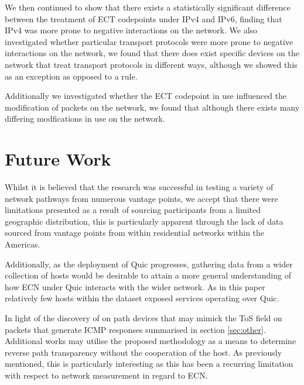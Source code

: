 \documentclass{l4proj}
\begin{document}
We then continued to show that there exists a statistically significant difference between the treatment of ECT codepoints under IPv4 and IPv6, finding that IPv4 was more prone to negative interactions on the network. We also investigated whether particular transport protocols were more prone to negative interactions on the network, we found that there does exist specific devices on the network that treat transport protocols in different ways, although we showed this as an exception as opposed to a rule.

Additionally we investigated whether the ECT codepoint in use influenced the modification of packets on the network, we found that although there exists many differing modfications in use on the network.


\section{Future Work}

Whilst it is believed that the research was successful in testing a variety of network pathways from numerous vantage points, we accept that there were limitations presented as a result of sourcing participants from a limited geographic distribution, this is particularly apparent through the lack of data sourced from vantage points from within residential networks within the Americas.

Additionally, as the deployment of Quic progresses, gathering data from a wider collection of hosts would be desirable to attain a more general understanding of how ECN under Quic interacts with the wider network. As in this paper relatively few hosts within the dataset exposed services operating over Quic.

In light of the discovery of on path devices that may mimick the ToS field on packets that generate ICMP responses summarised in section \ref{sec:other}. Additional works may utilise the proposed methodology as a means to determine reverse path transparency without the cooperation of the host. As previously mentioned, this is particularly interesting as this has been a recurring limitation with respect to network measurement in regard to ECN.


%
% 
\end{document}
